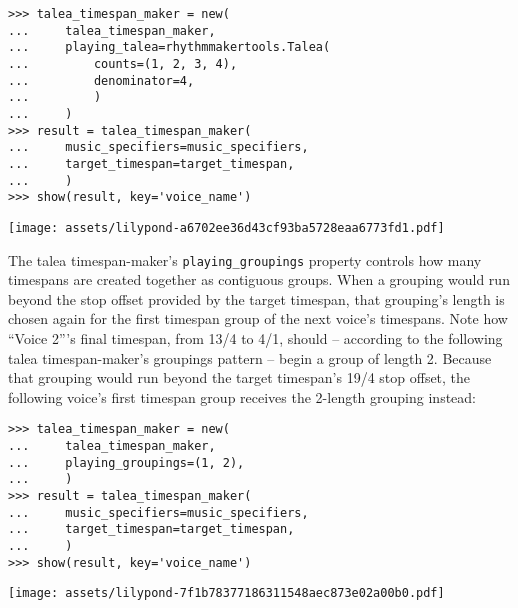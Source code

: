 \begin{singlespacing}
\vspace{-0.5\baselineskip}
\begin{lstlisting}
>>> talea_timespan_maker = new(
...     talea_timespan_maker,
...     playing_talea=rhythmmakertools.Talea(
...         counts=(1, 2, 3, 4),
...         denominator=4,
...         )
...     )
>>> result = talea_timespan_maker(
...     music_specifiers=music_specifiers,
...     target_timespan=target_timespan,
...     )
>>> show(result, key='voice_name')
\end{lstlisting}
\noindent\texttt{[image: assets/lilypond-a6702ee36d43cf93ba5728eaa6773fd1.pdf]}
\end{singlespacing}

\noindent The talea timespan-maker's \texttt{playing\_groupings} property
controls how many timespans are created together as contiguous groups. When a
grouping would run beyond the stop offset provided by the target timespan, that
grouping's length is chosen again for the first timespan group of the next
voice's timespans. Note how \enquote{Voice 2}'s final timespan, from 13/4 to
4/1, should -- according to the following talea timespan-maker's groupings
pattern -- begin a group of length 2. Because that grouping would run beyond
the target timespan's 19/4 stop offset, the following voice's first timespan
group receives the 2-length grouping instead:

\begin{comment}
<abjad>
talea_timespan_maker = new(
    talea_timespan_maker,
    playing_groupings=(1, 2),
    )
result = talea_timespan_maker(
    music_specifiers=music_specifiers,
    target_timespan=target_timespan,
    )
show(result, key='voice_name')
</abjad>
\end{comment}

\begin{singlespacing}
\vspace{-0.5\baselineskip}
\begin{lstlisting}
>>> talea_timespan_maker = new(
...     talea_timespan_maker,
...     playing_groupings=(1, 2),
...     )
>>> result = talea_timespan_maker(
...     music_specifiers=music_specifiers,
...     target_timespan=target_timespan,
...     )
>>> show(result, key='voice_name')
\end{lstlisting}
\noindent\texttt{[image: assets/lilypond-7f1b78377186311548aec873e02a00b0.pdf]}
\end{singlespacing}

